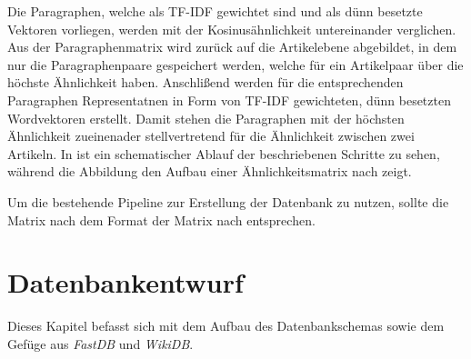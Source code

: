 Die Paragraphen, welche als TF-IDF gewichtet sind und als dünn besetzte Vektoren vorliegen, werden mit der Kosinusähnlichkeit untereinander verglichen.
Aus der Paragraphenmatrix wird zurück auf die Artikelebene abgebildet, in dem nur die Paragraphenpaare gespeichert werden, welche für ein Artikelpaar über die höchste Ähnlichkeit haben.
Anschlißend werden für die entsprechenden Paragraphen Representatnen in Form von TF-IDF gewichteten, dünn besetzten Wordvektoren erstellt.
Damit stehen die Paragraphen mit der höchsten Ähnlichkeit zueinenader stellvertretend für die Ähnlichkeit zwischen zwei Artikeln.
In  ist ein schematischer Ablauf der beschriebenen Schritte zu sehen, während die Abbildung  den Aufbau einer Ähnlichkeitsmatrix nach \cite{licht:2017} zeigt.

Um die bestehende Pipeline zur Erstellung der Datenbank zu nutzen, sollte die Matrix nach \cite{licht:2017} dem Format der Matrix nach \cite{riehmann2016visualizing} entsprechen.



\section{Datenbankentwurf}
\label{subchap:database}
Dieses Kapitel befasst sich mit dem Aufbau des Datenbankschemas sowie dem Gefüge aus \emph{FastDB} und \emph{WikiDB}.


